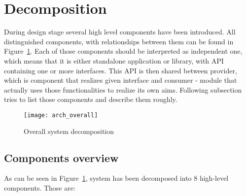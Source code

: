 %
\section{Decomposition}
\label{sec:arch_decomposition}

During design stage several high level components have been introduced. All distinguished components, with relationships between them can be found in Figure~\ref{fig:arch_overall}. Each of those components should be interpreted as independent one, which means that it is either standalone application or library, with API containing one or more interfaces. This API is then shared between provider, which is component that realizes given interface and consumer - module that actually uses those functionalities to realize its own aims. Following subsection tries to list those components and describe them roughly. 

\begin{figure}[ht]
\centering
\texttt{[image: arch\_overall]}
\caption{Overall system decomposition}
\label{fig:arch_overall}
\end{figure}

\subsection{Components overview}

As can be seen in Figure~\ref{fig:arch_overall}, system has been decomposed into 8 high-level components. Those are:

